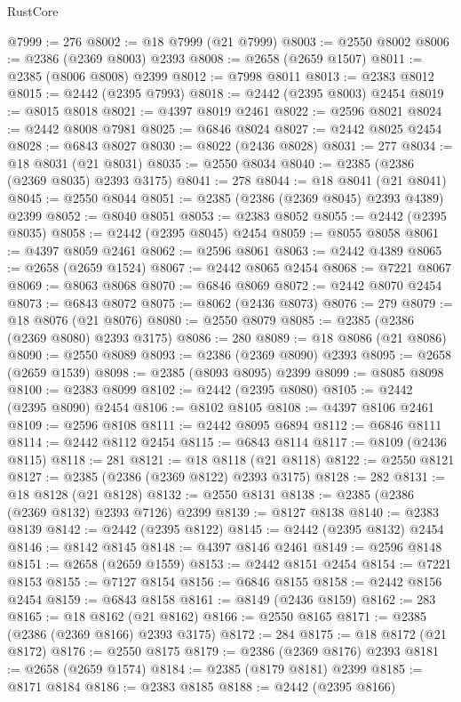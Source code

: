 \begin{lexlean}{RustCore}
\begin{coremodule}
@7999 := 276
@8002 := @18 @7999 (@21 @7999)
@8003 := @2550 @8002
@8006 := @2386 (@2369 @8003) @2393
@8008 := @2658 (@2659 @1507)
@8011 := @2385 (@8006 @8008) @2399
@8012 := @7998 @8011
@8013 := @2383 @8012
@8015 := @2442 (@2395 @7993)
@8018 := @2442 (@2395 @8003) @2454
@8019 := @8015 @8018
@8021 := @4397 @8019 @2461
@8022 := @2596 @8021
@8024 := @2442 @8008 @7981
@8025 := @6846 @8024
@8027 := @2442 @8025 @2454
@8028 := @6843 @8027
@8030 := @8022 (@2436 @8028)
@8031 := 277
@8034 := @18 @8031 (@21 @8031)
@8035 := @2550 @8034
@8040 := @2385 (@2386 (@2369 @8035) @2393 @3175)
@8041 := 278
@8044 := @18 @8041 (@21 @8041)
@8045 := @2550 @8044
@8051 := @2385 (@2386 (@2369 @8045) @2393 @4389) @2399
@8052 := @8040 @8051
@8053 := @2383 @8052
@8055 := @2442 (@2395 @8035)
@8058 := @2442 (@2395 @8045) @2454
@8059 := @8055 @8058
@8061 := @4397 @8059 @2461
@8062 := @2596 @8061
@8063 := @2442 @4389
@8065 := @2658 (@2659 @1524)
@8067 := @2442 @8065 @2454
@8068 := @7221 @8067
@8069 := @8063 @8068
@8070 := @6846 @8069
@8072 := @2442 @8070 @2454
@8073 := @6843 @8072
@8075 := @8062 (@2436 @8073)
@8076 := 279
@8079 := @18 @8076 (@21 @8076)
@8080 := @2550 @8079
@8085 := @2385 (@2386 (@2369 @8080) @2393 @3175)
@8086 := 280
@8089 := @18 @8086 (@21 @8086)
@8090 := @2550 @8089
@8093 := @2386 (@2369 @8090) @2393
@8095 := @2658 (@2659 @1539)
@8098 := @2385 (@8093 @8095) @2399
@8099 := @8085 @8098
@8100 := @2383 @8099
@8102 := @2442 (@2395 @8080)
@8105 := @2442 (@2395 @8090) @2454
@8106 := @8102 @8105
@8108 := @4397 @8106 @2461
@8109 := @2596 @8108
@8111 := @2442 @8095 @6894
@8112 := @6846 @8111
@8114 := @2442 @8112 @2454
@8115 := @6843 @8114
@8117 := @8109 (@2436 @8115)
@8118 := 281
@8121 := @18 @8118 (@21 @8118)
@8122 := @2550 @8121
@8127 := @2385 (@2386 (@2369 @8122) @2393 @3175)
@8128 := 282
@8131 := @18 @8128 (@21 @8128)
@8132 := @2550 @8131
@8138 := @2385 (@2386 (@2369 @8132) @2393 @7126) @2399
@8139 := @8127 @8138
@8140 := @2383 @8139
@8142 := @2442 (@2395 @8122)
@8145 := @2442 (@2395 @8132) @2454
@8146 := @8142 @8145
@8148 := @4397 @8146 @2461
@8149 := @2596 @8148
@8151 := @2658 (@2659 @1559)
@8153 := @2442 @8151 @2454
@8154 := @7221 @8153
@8155 := @7127 @8154
@8156 := @6846 @8155
@8158 := @2442 @8156 @2454
@8159 := @6843 @8158
@8161 := @8149 (@2436 @8159)
@8162 := 283
@8165 := @18 @8162 (@21 @8162)
@8166 := @2550 @8165
@8171 := @2385 (@2386 (@2369 @8166) @2393 @3175)
@8172 := 284
@8175 := @18 @8172 (@21 @8172)
@8176 := @2550 @8175
@8179 := @2386 (@2369 @8176) @2393
@8181 := @2658 (@2659 @1574)
@8184 := @2385 (@8179 @8181) @2399
@8185 := @8171 @8184
@8186 := @2383 @8185
@8188 := @2442 (@2395 @8166)

\end{coremodule}
\end{lexlean}
